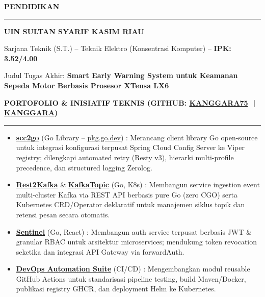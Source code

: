 \documentclass[11pt,a4paper]{article}
\newcommand\nv[1][-0.45em]{\vspace{#1}}
\newcommand{\pipe}{\,\,|\,\,}
\newcommand{\resumeSection}[1]{
  \raggedright\MakeUppercase{\large\textbf{#1}}
  \break\vspace{-1.0em}
  \hrule
  \vspace{0.2em}
}
\newcommand{\resumeSectionItem}[4]{
  \normalsize\raggedright\textbf{#1}\hfill
  \small\raggedleft{#2}\\[-0.1em]
  \small\raggedright{#3}\hfill
  \small\raggedleft{#4}\\[-0.15em]
}
\begin{document}
\begingroup
\resumeSection{PENDIDIKAN}
\resumeSectionItem{UIN SULTAN SYARIF KASIM RIAU}{Pekanbaru, Riau, Indonesia}{{Sarjana Teknik (S.T.) -- Teknik Elektro (Konsentrasi Komputer) --} \textbf{IPK: 3.52/4.00}}{2016 - 2022}
\small\raggedright{Judul Tugas Akhir: \textbf{Smart Early Warning System untuk Keamanan Sepeda Motor Berbasis Prosesor XTensa LX6}}\\
\small{}
\vspace{0.2em}
\endgroup

\begingroup
\resumeSection{PORTOFOLIO \& INISIATIF TEKNIS (GITHUB: \href{https://github.com/kanggara75}{kanggara75} \pipe \href{https://github.com/kanggara}{kanggara})}
\nv\small\justifying\begin{itemize}
  \item{\href{https://github.com/kanggara75/scc2go}{\textbf{scc2go}} (Go Library -- \href{https://pkg.go.dev/github.com/KAnggara75/scc2go}{pkg.go.dev}) : Merancang client library Go open-source untuk integrasi konfigurasi terpusat Spring Cloud Config Server ke Viper registry; dilengkapi automated retry (Resty v3), hierarki multi-profile precedence, dan structured logging Zerolog.}\nv
  \item{\href{https://github.com/kanggara75/Rest2Kafka}{\textbf{Rest2Kafka}} \& \href{https://github.com/kanggara/KafkaTopic}{\textbf{KafkaTopic}} (Go, K8s) : Membangun service ingestion event multi-cluster Kafka via REST API berbasis pure Go (zero CGO) serta Kubernetes CRD/Operator deklaratif untuk manajemen siklus topik dan retensi pesan secara otomatis.}\nv
  \item{\href{https://github.com/kanggara75/sentinel}{\textbf{Sentinel}} (Go, React) : Membangun auth service terpusat berbasis JWT \& granular RBAC untuk arsitektur microservices; mendukung token revocation seketika dan integrasi API Gateway via forwardAuth.}\nv
  \item{\href{https://github.com/kanggara/DevOps}{\textbf{DevOps Automation Suite}} (CI/CD) : Mengembangkan modul reusable GitHub Actions untuk standarisasi pipeline testing, build Maven/Docker, publikasi registry GHCR, dan deployment Helm ke Kubernetes.}
\end{itemize}
\endgroup
\end{document}
